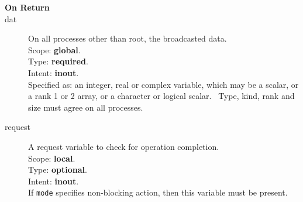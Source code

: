 \begin{description}
\item[\bf On Return]
\item[dat] On all processes other than  root, the broadcasted data.\\
Scope: {\bf global}.\\
Type: {\bf required}.\\
Intent: {\bf inout}.\\
Specified as: an integer, real or complex variable, which may be a
scalar, or a rank 1 or 2 array, or a character or logical scalar. \
Type, kind, rank and size must agree on all processes.
\item[request] A request variable to check for operation completion.\\
Scope: {\bf local}.\\
Type: {\bf optional}.\\
Intent: {\bf inout}.\\
If \verb|mode| specifies non-blocking action, then this
variable must be present.
\end{description}

